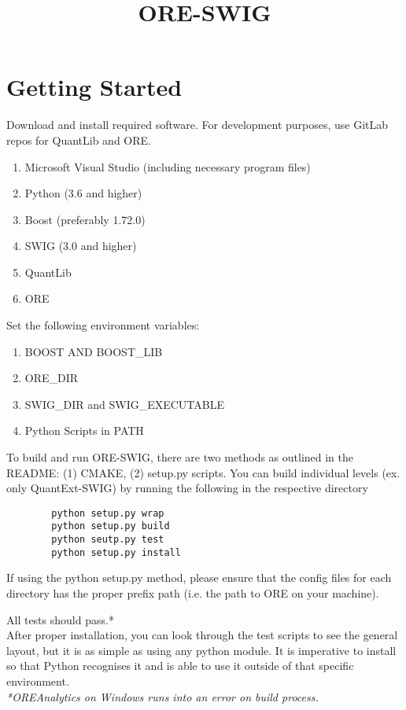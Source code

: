 \documentclass[10pt]{article}
\title{ORE-SWIG}
\date{}
\begin{document}
\maketitle
\section*{Getting Started}
    Download and install required software. For development purposes, use GitLab repos for QuantLib and ORE.
\begin{enumerate}
    \item Microsoft Visual Studio (including necessary program files)
    \item Python (3.6 and higher)
    \item Boost (preferably 1.72.0)
    \item SWIG (3.0 and higher)
    \item QuantLib
    \item ORE
\end{enumerate}

Set the following environment variables:
\begin{enumerate}
    \item BOOST AND BOOST\_LIB
    \item ORE\_DIR
    \item SWIG\_DIR and SWIG\_EXECUTABLE 
    \item Python Scripts in PATH
\end{enumerate}

To build and run ORE-SWIG, there are two methods as outlined in the README: (1) CMAKE, (2) setup.py scripts. You can build individual levels (ex. only QuantExt-SWIG) by running the following in the respective directory
\begin{lstlisting}
        python setup.py wrap 
        python setup.py build 
        python seutp.py test 
        python setup.py install 
\end{lstlisting}

If using the python setup.py method, please ensure that the config files for each directory has the proper prefix path (i.e. the path to ORE on your machine).

All tests should pass.* \\
After proper installation, you can look through the test scripts to see the general layout, but it is as simple as using any python module. It is imperative to install so that Python recognises it and is able to use it outside of that specific environment.\\
\textit{*OREAnalytics on Windows runs into an error on build process.}
\end{document}
